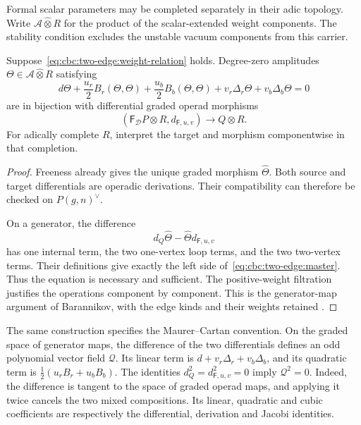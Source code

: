 Formal scalar parameters may be completed separately in their adic topology.
Write $\mathcal A\widehat\otimes R$ for the product of the scalar-extended weight components.
The stability condition excludes the unstable vacuum components from this carrier.

\begin{theorem}\label{thm:cbc:two-edge:master}
Suppose~\eqref{eq:cbc:two-edge:weight-relation} holds.
Degree-zero amplitudes $\Theta\in\mathcal A\widehat\otimes R$ satisfying
\begin{equation}\label{eq:cbc:two-edge:master}
 d\Theta
 +\frac{u_r}{2}B_r(\Theta,\Theta)
 +\frac{u_b}{2}B_b(\Theta,\Theta)
 +v_r\Delta_r\Theta+v_b\Delta_b\Theta=0
\end{equation}
are in bijection with differential graded operad morphisms
\[
 (\mathsf F_{\mathcal D}P\otimes R,d_{\mathsf F,u,v})\longrightarrow Q\otimes R.
\]
For adically complete $R$, interpret the target and morphism componentwise in that completion.
\end{theorem}
\begin{proof}
Freeness already gives the unique graded morphism $\widehat\Theta$.
Both source and target differentials are operadic derivations.
Their compatibility can therefore be checked on $P(g,n)^\vee$.

On a generator, the difference
\[
 d_Q\widehat\Theta-\widehat\Theta d_{\mathsf F,u,v}
\]
has one internal term, the two one-vertex loop terms, and the two two-vertex terms.
Their definitions give exactly the left side of~\eqref{eq:cbc:two-edge:master}.
Thus the equation is necessary and sufficient.
The positive-weight filtration justifies the operations component by component.
This is the generator-map argument of Barannikov, with the edge kinds and their weights retained \cite[\S\S4--5]{BarannikovBV2007}.
\end{proof}

The same construction specifies the Maurer--Cartan convention.
On the graded space of generator maps, the difference of the two differentials defines an odd polynomial vector field $\mathcal Q$.
Its linear term is $d+v_r\Delta_r+v_b\Delta_b$, and its quadratic term is $\tfrac12(u_rB_r+u_bB_b)$.
The identities $d_Q^2=d_{\mathsf F,u,v}^2=0$ imply $\mathcal Q^2=0$.
Indeed, the difference is tangent to the space of graded operad maps, and applying it twice cancels the two mixed compositions.
Its linear, quadratic and cubic coefficients are respectively the differential, derivation and Jacobi identities.

